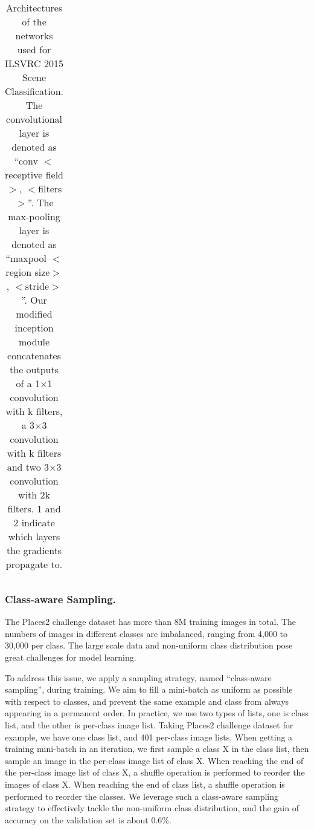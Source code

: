 \documentclass[runningheads]{llncs}
\begin{document}
\begin{table}[t]
\begin{center}
\begin{tabular}{p{1.5cm}<{\centering}|p{1.5cm}<{\centering}|p{3.5cm}<{\centering}|p{5.0cm}<{\centering}}
\hline
\end{tabular}
\end{center}
\caption{Architectures of the networks used for ILSVRC 2015 Scene Classification.
The convolutional layer is denoted as ``conv $<$receptive field$>$, $<$filters$>$''.
The max-pooling layer is denoted as ``maxpool $<$region size$>$, $<$stride$>$''.
Our modified inception module concatenates the outputs of a 1$\times$1 convolution with k filters,
a 3$\times$3 convolution with k filters and two 3$\times$3 convolution with 2k filters.
\normalsize\textcircled{\scriptsize{1}} and \normalsize\textcircled{\scriptsize{2}}
indicate which layers the gradients propagate to.}
\label{tab:architectures}
\end{table}

\subsubsection{Class-aware Sampling.}
The Places2 challenge dataset has more than 8M training images in total. The numbers
of images in different classes are imbalanced, ranging from 4,000 to 30,000 per class.
The large scale data and non-uniform class distribution pose great challenges for model learning.

To address this issue, we apply a sampling strategy, named ``class-aware sampling'', during training.
We aim to fill a mini-batch as uniform as possible with respect to classes,
and prevent the same example and class from always appearing in a permanent order.
In practice, we use two types of lists, one is class list, and the
other is per-class image list. Taking Places2 challenge dataset for example, we have one class list, and 401 per-class image lists.
When getting a training mini-batch in an iteration,
we first sample a class X in the class list, then sample an image in
the per-class image list of class X. When reaching the end of the per-class image list of class X,
a shuffle operation is performed to reorder the images of class X.
When reaching the end of class list, a shuffle operation is performed to reorder the classes.
We leverage such a class-aware sampling strategy to effectively tackle the non-uniform class distribution,
and the gain of accuracy on the validation set is about 0.6\%.
\end{document}
